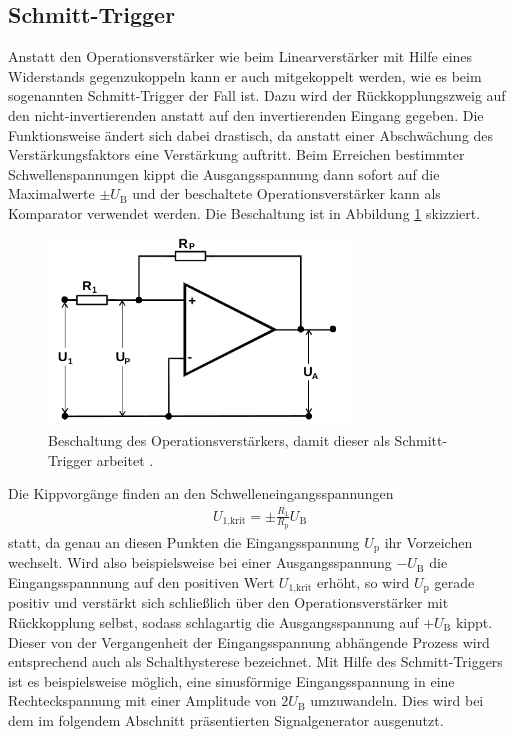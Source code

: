 \subsection{Schmitt-Trigger}

Anstatt den Operationsverstärker wie beim Linearverstärker mit Hilfe eines Widerstands gegenzukoppeln kann
er auch mitgekoppelt werden, wie es beim sogenannten Schmitt-Trigger der Fall ist. Dazu wird der Rückkopplungszweig
auf den nicht-invertierenden anstatt auf den invertierenden Eingang
gegeben. Die Funktionsweise ändert sich dabei drastisch, da anstatt einer Abschwächung des Verstärkungsfaktors
eine Verstärkung auftritt. Beim Erreichen bestimmter Schwellenspannungen kippt die Ausgangsspannung dann sofort auf
die Maximalwerte $\pm U_\text{B}$ und der beschaltete Operationsverstärker kann als Komparator verwendet werden.
Die Beschaltung ist in Abbildung \ref{fig:schmitttrigger} skizziert.

\begin{figure}
  \centering
  \includegraphics[height=5cm]{ImmerDieseNorweger/schmitttrigger.png}
  \caption{Beschaltung des Operationsverstärkers, damit dieser als Schmitt-Trigger arbeitet \cite{anleitung}.}
  \label{fig:schmitttrigger}
\end{figure}

Die Kippvorgänge finden an den Schwelleneingangsspannungen
\begin{align}
  U_\text{1,krit} = \pm \frac{R_1}{R_\text{p}} U_\text{B}
\end{align}
statt, da genau an diesen Punkten die Eingangsspannung $U_\text{p}$ ihr Vorzeichen
wechselt. Wird also beispielsweise bei einer Ausgangsspannung $-U_\text{B}$ die Eingangsspannnung
auf den positiven Wert $U_\text{1,krit}$ erhöht, so wird $U_\text{p}$ gerade positiv
und verstärkt sich schließlich über den Operationsverstärker mit Rückkopplung selbst,
sodass schlagartig die Ausgangsspannung auf $+U_\text{B}$ kippt. Dieser von der
Vergangenheit der Eingangsspannung abhängende Prozess wird entsprechend auch als Schalthysterese
bezeichnet. Mit Hilfe des Schmitt-Triggers ist es beispielsweise möglich, eine sinusförmige
Eingangsspannung in eine Rechteckspannung mit einer Amplitude von $2 U_\text{B}$ umzuwandeln.
Dies wird bei dem im folgendem Abschnitt präsentierten Signalgenerator ausgenutzt.

